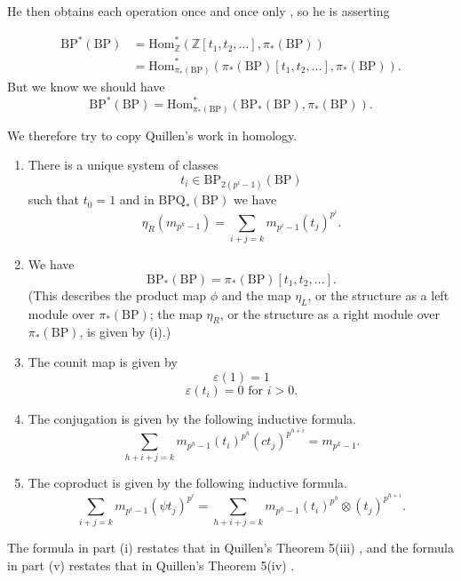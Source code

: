 \documentclass[../main]{subfiles}
\begin{document}
He then obtains each operation once and once only \cite[Theorem 5(i)]{quillen}, so he is asserting 

\begin{align*}
\mathrm {BP}^\ast(\mathrm {BP}) & = \mathrm{Hom}_{\mathbb Z}^\ast(\mathbb Z[t_1, t_2, \ldots], \pi_\ast(\mathrm{BP})) \\
& = \mathrm{Hom}_{\pi_\ast(\mathrm{BP})}^\ast
(\pi_\ast(\mathrm{BP})[t_1,t_2,\ldots], \pi_\ast(\mathrm{BP})).
\end{align*}
But we know we should have
\[
\mathrm{BP}^\ast(\mathrm{BP})
=\mathrm{Hom}_{\pi_\ast(\mathrm{BP})}^\ast
(\mathrm{BP}_\ast(\mathrm{BP}),\pi_\ast(\mathrm{BP})).
\]

We therefore try to copy Quillen's work in homology. 

\begin{theorem}
\label{thm:p2c16.1}
\begin{enumerate}
    \item[(i)] There is a unique system of classes \[t_i \in \mathrm {BP}_{2(p^i - 1)} (\mathrm{BP})\] such that $t_0 = 1$ and in $\mathrm{BPQ}_\ast(\mathrm {BP})$ we have \[\eta_R (m_{p^k - 1}) = \sum_{i + j = k} m_{p^i - 1} (t_j)^{p^i}.\]
    \item[(ii)] We have \[\mathrm{BP}_\ast(\mathrm{BP}) = \pi_\ast(\mathrm{BP}) [t_1, t_2, \ldots].\] (This describes the product map $\phi$ and the map $\eta_L$, or the structure as a left module over $\pi_\ast(\mathrm{BP})$; the map $\eta_R$, or the structure as a right module over $\pi_\ast(\mathrm{BP})$, is given by (i).)
    \item[(iii)] The counit map is given by 
    \[\varepsilon(1) = 1\]
    \[\varepsilon(t_i) = 0 \text { for } i > 0.\]
    
    \item[(iv)] The conjugation is given by the following inductive formula. 
    \[\sum_{h + i + j = k} m_{p^h - 1} (t_i)^{p^h} (ct_j)^{p^{h + i}} = m_{p^k - 1}.\]
    
    \item[(v)] The coproduct is given by the following inductive formula. \[\sum_{i + j = k} m_{p^i - 1} (\psi t_j)^{p^i} = \sum_{h + i + j = k} m_{p^h - 1} (t_i)^{p^h} \otimes (t_j)^{p^{h + i}}.\]
\end{enumerate}
\end{theorem}

The formula in part (i) restates that in Quillen's Theorem 5(iii) \cite{quillen}, and the formula in part (v) restates that in Quillen's Theorem 5(iv) \cite{quillen}. 
\end{document}
